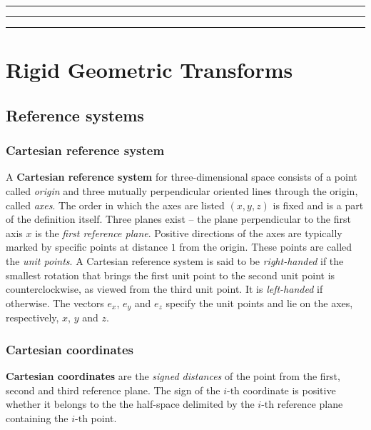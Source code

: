 \documentclass[10pt]{report}
\begin{document}
\vspace*{0.6cm}\hrule
\hrule
\hrule
\vspace*{0.4cm}
\chapter{Rigid Geometric Transforms}
\label{sec:orgbad3ad1}
\section{Reference systems}
\label{sec:org1cbb686}
\subsection{Cartesian reference system}
\label{sec:org5cbb158}
A \textbf{Cartesian reference system} for three\--dimensional space consists of a point called \emph{origin} and three mutually perpendicular oriented lines through the origin, called \emph{axes}. The order in which the axes are listed \((x, y, z)\) is fixed and is a part of the definition itself. Three planes exist -- the plane perpendicular to the first axis \(x\) is the \emph{first reference plane}. Positive directions of the axes are typically marked by specific points at distance \(1\) from the origin. These points are called the \emph{unit points}. A Cartesian reference system is said to be \emph{right\--handed} if the smallest rotation that brings the first unit point to the second unit point is counterclockwise, as viewed from the third unit point. It is \emph{left\--handed} if otherwise. The vectors \(e_x\), \(e_y\) and \(e_z\) specify the unit points and lie on the axes, respectively, \(x\), \(y\) and \(z\).
\subsection{Cartesian coordinates}
\label{sec:orgf15f9f7}
\textbf{Cartesian coordinates} are the \emph{signed distances} of the point from the first, second and third reference plane. The sign of the \(i\mbox{-th}\) coordinate is positive whether it belongs to the the half\--space delimited by the \(i\mbox{-th}\) reference plane containing the \(i\mbox{-th}\) point.
\end{document}

